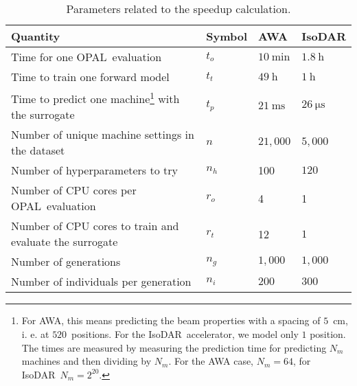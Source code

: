 \documentclass[a4paper, 12pt, version-1-compatibility]{article}
\def\forwardmodel{forward model}
\def\isodar{IsoDAR}
\def\opal{OPAL}
\begin{document}
\begin{table}
    \centering
    \begin{tabular}{llll}
    \toprule
    Quantity & Symbol & AWA & \isodar \\
    \midrule
    Time for one \opal\ evaluation & $t_o$ & $\SI{10}{\minute}$ & $\SI{1.8}{\hour}$\\
    Time to train one \forwardmodel & $t_t$ & $\SI{49}{\hour}$ & $\SI{1}{\hour}$ %
    \\
    Time to predict one machine\footnote{For AWA, this means predicting the beam properties with a spacing of $5$~cm, i. e. at $520$~positions. For the \isodar\ accelerator, we model only $1$ position. The times are measured by measuring the prediction time for predicting $N_m$ machines and then dividing by $N_m$. For the AWA case, $N_m = 64$, for \isodar\ $N_m = 2^{20}$.} with the surrogate & $t_p$ & $\SI{21}{\milli \second}$ & $\SI{26}{\micro \second}$\\
    Number of unique machine settings in the dataset & $n$ & $21,000$ & $5,000$\\
    Number of hyperparameters to try & $n_h$ & 100 & $120$\\
    Number of CPU cores per \opal\ evaluation & $r_o$ & 4 & 1\\
    Number of CPU cores to train and evaluate the surrogate & $r_t$ & 12 & $1$\\
    Number of generations & $n_g$ & $1,000$ & $1,000$\\
    Number of individuals per generation & $n_i$ & $200$ & $300$\\
    \bottomrule
    \end{tabular}
    \caption{Parameters related to the speedup calculation.}
    \label{tab:speedup_table}
\end{table}
\end{document}
